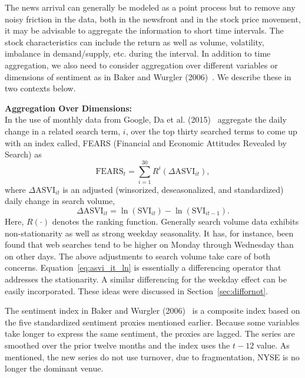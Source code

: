The news arrival can generally be modeled as a point process but to remove any noisy friction in the data, both in the newsfront and in the stock price movement, it may be advisable to aggregate the information to short time intervals. The stock characteristics can include the return as well as volume, volatility, imbalance in demand/supply, etc. during the interval. In addition to time aggregation, we also need to consider aggregation over different variables or dimensions of sentiment as in Baker and Wurgler (2006)~\cite{baker2006investor}. We describe these in two contexts below. \twomedskip


\noindent\textbf{Aggregation Over Dimensions:} \\


In the use of monthly data from Google, Da et al. (2015)~\cite{da2015sum} aggregate the daily change in a related search term, $i$, over the top thirty searched terms to come up with an index called, FEARS (Financial and Economic Attitudes Revealed by Search) as 
	\begin{equation} \label{eqn:fears}
	\text{FEARS}_t = \sum_{i=1}^{30} R^i (\Delta \text{ASVI}_{it}),
	\end{equation}
where $\Delta \text{ASVI}_{it}$ is an adjusted (winsorized, deseasonalized, and standardized) daily change in search volume, 
	\begin{equation} \label{eq:asvi_it_ln}
	\Delta \text{ASVI}_{it} = \ln(\text{SVI}_{it}) - \ln(\text{SVI}_{it-1}).
	\end{equation}
Here, $R(\cdot)$ denotes the ranking function. Generally search volume data exhibits non-stationarity as well as strong weekday seasonality. It has, for instance, been found that web searches tend to be higher on Monday through Wednesday than on other days. The above adjustments to search volume take care of both concerns. Equation~\ref{eq:asvi_it_ln} is essentially a differencing operator that addresses the stationarity. A similar differencing for the weekday effect can be easily incorporated. These ideas were discussed in Section~\ref{sec:diffornot}.


The sentiment index in Baker and Wurgler (2006)~\cite{baker2006investor} is a composite index based on the five standardized sentiment proxies mentioned earlier. Because some variables take longer to express the same sentiment, the proxies are lagged. The series are smoothed over the prior twelve months and the index uses the $t-12$ value. As mentioned, the new series do not use turnover, due to fragmentation, NYSE is no longer the dominant venue. 



